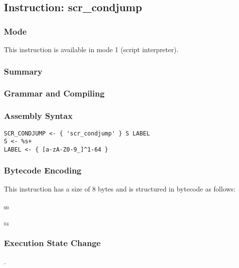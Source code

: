 \subsection{Instruction: scr\_condjump}

\subsubsection{Mode}
This instruction is available in mode 1 (script interpreter).
\subsubsection{Summary}


\subsubsection{Grammar and Compiling}


\subsubsection{Assembly Syntax}

\begin{myquote}
\begin{verbatim}
SCR_CONDJUMP <- { 'scr_condjump' } S LABEL
S <- %s+
LABEL <- { [a-zA-Z0-9_]^1-64 }
\end{verbatim}
\end{myquote}

\subsubsection{Bytecode Encoding}

This instruction has a size of 8 bytes and is structured in bytecode as follows:

$_{00}$\ 



$_{04}$\ 

\subsubsection{Execution State Change}

.


